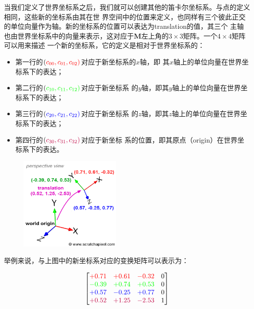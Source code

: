 \documentclass[12pt]{article}
\begin{document}
\indent{}当我们定义了世界坐标系之后，我们就可以创建其他的笛卡尔坐标系。与点的定义相同，这些新的坐标系由其在世
界空间中的位置来定义，也同样有三个彼此正交的单位向量作为轴。新的坐标系的位置可以表达为translation的值，其三个
主轴也由世界坐标系中的向量来表示，这对应于$\mathbf{M}$左上角的$3\times 3$矩阵。一个$4\times 4$矩阵可以用来描述
一个新的坐标系，它的定义是相对于世界坐标系的：

\begin{itemize}
\item 第一行的$(\color{red}{c_{00}}, \color{red}{c_{01}}, {\color{red}{c_{02}}})$对应于新坐标系的$x$轴，即
其$x$轴上的单位向量在世界坐标系下的表达；
\item 第二行的$(\color{green}{c_{10}}, \color{green}{c_{11}}, {\color{green}{c_{12}}})$对应于新坐标系
的$y$轴，即其$y$轴上的单位向量在世界坐标系下的表达；
\item 第三行的$(\color{blue}{c_{20}}, \color{blue}{c_{21}}, {\color{blue}{c_{22}}})$对应于新坐标系
的$z$轴，即其$z$轴上的单位向量在世界坐标系下的表达；
\item 第四行的$(\color{purple}{c_{30}}, \color{purple}{c_{31}}, {\color{purple}{c_{32}}})$对应于新坐标
系的位置，即其原点（origin）在世界坐标系下的表达。
\end{itemize}

\begin{figure}[h]
\centering
\includegraphics[width=5cm]{./imgs/coordsys.png}
\end{figure}

\noindent{}举例来说，与上图中的新坐标系对应的变换矩阵可以表示为：

\begin{displaymath}
\begin{bmatrix}
\color{red}{+0.71}&\color{red}{+0.61}&\color{red}{-0.32}&0\\
\color{green}{-0.39}&\color{green}{+0.74}&\color{green}{+0.53}&0\\
\color{blue}{+0.57}&\color{blue}{-0.25}&\color{blue}{+0.77}&0\\
\color{purple}{+0.52}&\color{purple}{+1.25}&\color{purple}{-2.53}&1\\
\end{bmatrix}
\end{displaymath}
\end{document}
